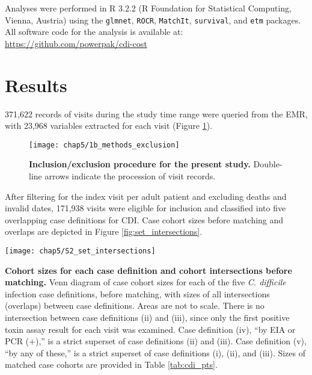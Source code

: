 Analyses were performed in R 3.2.2 (R Foundation for Statistical Computing, Vienna, Austria) using the \texttt{glmnet},\autocite{Friedman2010} \texttt{ROCR},\autocite{Sing2005} \texttt{MatchIt},\autocite{Ho2011} \texttt{survival}, and \texttt{etm}\autocite{Allignol2011} packages. All software code for the analysis is available at: \url{https://github.com/powerpak/cdi-cost}

\section{Results}

371,622 records of visits during the study time range were queried from the EMR, with 23,968 variables extracted for each visit (Figure \ref{fig:exclusions}).
\begin{figure}[htb]
  \texttt{[image: chap5/1b\_methods\_exclusion]}               
  \caption[Inclusion/exclusion procedure for this study]{\textbf{Inclusion/exclusion procedure for the present study.} Double-line arrows indicate the procession of visit records.}
  \label{fig:exclusions}
\end{figure}
After filtering for the index visit per adult patient and excluding deaths and invalid dates, 171,938 visits were eligible for inclusion and classified into five overlapping case definitions for CDI. Case cohort sizes before matching and overlaps are depicted in Figure \ref{fig:set_intersections}.

\begin{marginfigure}[-4cm]
  \texttt{[image: chap5/S2\_set\_intersections]}               
  \caption[Cohort sizes for each case definition and cohort intersections before matching]{\textbf{Cohort sizes for each case definition and cohort intersections before matching.} Venn diagram of case cohort sizes for each of the five \emph{C. difficile} infection case definitions, before matching, with sizes of all intersections (overlaps) between case definitions. Areas are not to scale. There is no intersection between case definitions (ii) and (iii), since only the first positive toxin assay result for each visit was examined. Case definition (iv), “by EIA or PCR (+),” is a strict superset of case definitions (ii) and (iii). Case definition (v), “by any of these,” is a strict superset of case definitions (i), (ii), and (iii). Sizes of matched case cohorts are provided in Table \ref{tab:cdi_pts}.}
  \label{fig:set_intersections}
\end{marginfigure}

